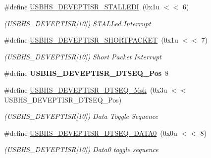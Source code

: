 \begin{DoxyCompactItemize}
\#define \mbox{\hyperlink{group__SAMS70__USBHS_ga8c7202988532c09acf4906a50eb93b1e}{U\+S\+B\+H\+S\+\_\+\+D\+E\+V\+E\+P\+T\+I\+S\+R\+\_\+\+S\+T\+A\+L\+L\+E\+DI}}~(0x1u $<$$<$ 6)
\begin{DoxyCompactList}\small\item\em (U\+S\+B\+H\+S\+\_\+\+D\+E\+V\+E\+P\+T\+I\+SR\mbox{[}10\mbox{]}) S\+T\+A\+L\+Led Interrupt \end{DoxyCompactList}\item 
\mbox{\label{group__SAMS70__USBHS_ga772ac931e2e8399d48549904ea66137c}} 
\#define \mbox{\hyperlink{group__SAMS70__USBHS_ga772ac931e2e8399d48549904ea66137c}{U\+S\+B\+H\+S\+\_\+\+D\+E\+V\+E\+P\+T\+I\+S\+R\+\_\+\+S\+H\+O\+R\+T\+P\+A\+C\+K\+ET}}~(0x1u $<$$<$ 7)
\begin{DoxyCompactList}\small\item\em (U\+S\+B\+H\+S\+\_\+\+D\+E\+V\+E\+P\+T\+I\+SR\mbox{[}10\mbox{]}) Short Packet Interrupt \end{DoxyCompactList}\item 
\mbox{\label{group__SAMS70__USBHS_gac0b20e7f751dce14b2a533e177695489}} 
\#define {\bfseries U\+S\+B\+H\+S\+\_\+\+D\+E\+V\+E\+P\+T\+I\+S\+R\+\_\+\+D\+T\+S\+E\+Q\+\_\+\+Pos}~8
\item 
\mbox{\label{group__SAMS70__USBHS_gab87a693003d1be232a36df45a45d35fa}} 
\#define \mbox{\hyperlink{group__SAMS70__USBHS_gab87a693003d1be232a36df45a45d35fa}{U\+S\+B\+H\+S\+\_\+\+D\+E\+V\+E\+P\+T\+I\+S\+R\+\_\+\+D\+T\+S\+E\+Q\+\_\+\+Msk}}~(0x3u $<$$<$ U\+S\+B\+H\+S\+\_\+\+D\+E\+V\+E\+P\+T\+I\+S\+R\+\_\+\+D\+T\+S\+E\+Q\+\_\+\+Pos)
\begin{DoxyCompactList}\small\item\em (U\+S\+B\+H\+S\+\_\+\+D\+E\+V\+E\+P\+T\+I\+SR\mbox{[}10\mbox{]}) Data Toggle Sequence \end{DoxyCompactList}\item 
\mbox{\label{group__SAMS70__USBHS_ga686110b80786155ed941911f7bf7bac0}} 
\#define \mbox{\hyperlink{group__SAMS70__USBHS_ga686110b80786155ed941911f7bf7bac0}{U\+S\+B\+H\+S\+\_\+\+D\+E\+V\+E\+P\+T\+I\+S\+R\+\_\+\+D\+T\+S\+E\+Q\+\_\+\+D\+A\+T\+A0}}~(0x0u $<$$<$ 8)
\begin{DoxyCompactList}\small\item\em (U\+S\+B\+H\+S\+\_\+\+D\+E\+V\+E\+P\+T\+I\+SR\mbox{[}10\mbox{]}) Data0 toggle sequence \end{DoxyCompactList}\item 

\end{DoxyCompactItemize}
